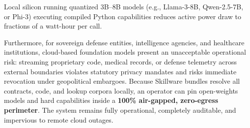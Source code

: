 Local silicon running quantized 3B--8B models (e.g., Llama-3-8B, Qwen-2.5-7B, or Phi-3) executing compiled Python capabilities reduces active power draw to fractions of a watt-hour per call.

Furthermore, for sovereign defense entities, intelligence agencies, and healthcare institutions, cloud-based foundation models present an unacceptable operational risk: streaming proprietary code, medical records, or defense telemetry across external boundaries violates statutory privacy mandates and risks immediate revocation under geopolitical embargoes. Because Skillware bundles resolve all contracts, code, and lookup corpora locally, an operator can pin open-weights models and hard capabilities inside a \textbf{100\% air-gapped, zero-egress perimeter}. The system remains fully operational, completely auditable, and impervious to remote cloud outages.
